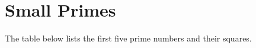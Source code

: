 \documentclass{article}
\begin{document}
\section*{Small Primes}
The table below lists the first five prime numbers and their squares.

\end{document}
